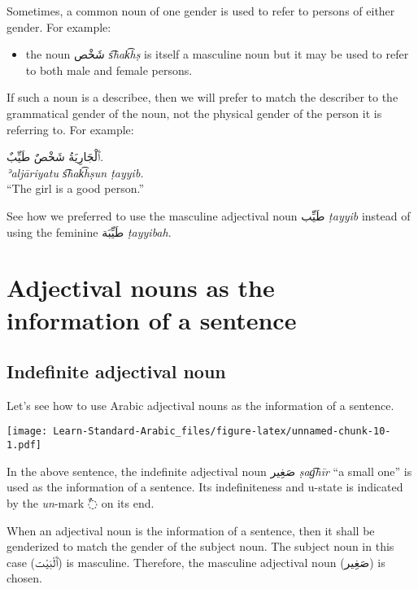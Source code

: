 \documentclass[
  10pt,
]{book}
\providecommand{\tightlist}{%
  \setlength{\itemsep}{0pt}\setlength{\parskip}{0pt}}
\begin{document}
Sometimes, a common noun of one gender is used to refer to persons of either gender. For example:

\begin{itemize}
\tightlist
\item
  the noun \foreignlanguage{arabic}{شَخْص} \emph{s͡hak͡hṣ} is itself a masculine noun but it may be used to refer to both male and female persons.
\end{itemize}

If such a noun is a describee, then we will prefer to match the describer to the grammatical gender of the noun, not the physical gender of the person it is referring to. For example:

\foreignlanguage{arabic}{ٱَلْجَارِيَةُ شَخْصٌ طَيِّبٌ.}\\
\emph{ʾaljāriyatu s͡hak͡hṣun ṭayyib.}\\
\enquote{The girl is a good person.}

See how we preferred to use the masculine adjectival noun \foreignlanguage{arabic}{طَيِّب} \emph{ṭayyib} instead of using the feminine \foreignlanguage{arabic}{طَيِّبَة} \emph{ṭayyibah}.

\section{Adjectival nouns as the information of a sentence}\label{adjectival-nouns-as-the-information-of-a-sentence}

\subsection{Indefinite adjectival noun}\label{indefinite-adjectival-noun}

Let's see how to use Arabic adjectival nouns as the information of a sentence.

\texttt{[image: Learn-Standard-Arabic\_files/figure-latex/unnamed-chunk-10-1.pdf]}

In the above sentence, the indefinite adjectival noun
\foreignlanguage{arabic}{صَغِير} \emph{ṣag͡hīr} \enquote{a small one}
is used as the information of a sentence. Its indefiniteness and u-state is indicated by the \emph{un}-mark \foreignlanguage{arabic}{◌ٌ} on its end.

When an adjectival noun is the information of a sentence, then it shall be genderized to match the gender of the subject noun. The subject noun in this case (\foreignlanguage{arabic}{ٱَلْبَيْت}) is masculine. Therefore, the masculine adjectival noun (\foreignlanguage{arabic}{صَغِير}) is chosen.
\end{document}
